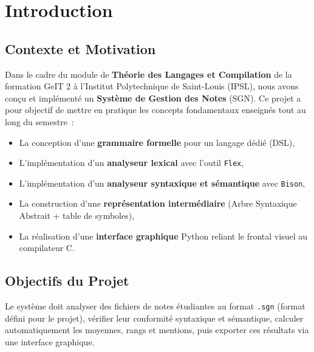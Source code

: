 \documentclass[a4paper,12pt]{article}
\begin{document}
\tableofcontents
\newpage
{}

\section{Introduction}

\subsection{Contexte et Motivation}

Dans le cadre du module de \textbf{Théorie des Langages et Compilation} de la formation GeIT 2 à l'Institut Polytechnique de Saint-Louis (IPSL), nous avons conçu et implémenté un \textbf{Système de Gestion des Notes} (SGN). Ce projet a pour objectif de mettre en pratique les concepts fondamentaux enseignés tout au long du semestre~:

\begin{itemize}[leftmargin=1.5em]
  \item La conception d'une \textbf{grammaire formelle} pour un langage dédié (DSL),
  \item L'implémentation d'un \textbf{analyseur lexical} avec l'outil \texttt{Flex},
  \item L'implémentation d'un \textbf{analyseur syntaxique et sémantique} avec \texttt{Bison},
  \item La construction d'une \textbf{représentation intermédiaire} (Arbre Syntaxique Abstrait + table de symboles),
  \item La réalisation d'une \textbf{interface graphique} Python reliant le frontal visuel au compilateur C.
\end{itemize}

\subsection{Objectifs du Projet}

Le système doit analyser des fichiers de notes étudiantes au format \texttt{.sgn} (format défini pour le projet), vérifier leur conformité syntaxique et sémantique, calculer automatiquement les moyennes, rangs et mentions, puis exporter ces résultats via une interface graphique.
\end{document}

